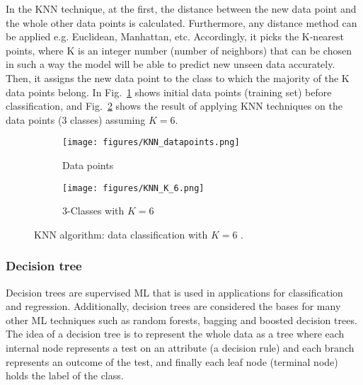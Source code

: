 In the KNN technique, at the first, the distance between the new data point and the whole other data points is calculated.
Furthermore, any distance method can be applied e.g. Euclidean, Manhattan, etc.
Accordingly, it picks the K-nearest points, where K is an integer number (number of neighbors) that can be chosen in such a way the model will be able to predict new unseen data accurately. 
Then, it assigns the new data point to the class to which the majority of the K data points belong.
In Fig.~\ref{fig:datapoints} shows initial data points (training set) before classification, and Fig.~\ref{fig:KNN_K_5} shows the result of applying KNN techniques on the data points (3 classes) assuming \(K=6\).
\begin{figure}[!h]
	\begin{subfigure}[b]{0.49\textwidth}		
		\centering
		\texttt{[image: figures/KNN\_datapoints.png]}
		\caption{Data points } 
		\label{fig:datapoints}
	\end{subfigure}
	\hfill
	\begin{subfigure}[b]{0.49\textwidth}
		\centering
		\texttt{[image: figures/KNN\_K\_6.png]}
		\caption{3-Classes with \(K=6\)} 
		\label{fig:KNN_K_5}
	\end{subfigure}	
	\caption{KNN algorithm: data classification with \(K=6\) .}
	\label{fig:KNN}
\end{figure}

\subsubsection{Decision tree}
Decision trees are supervised ML that is used in applications for classification and regression. 
Additionally, decision trees are considered the bases for many other ML techniques such as random forests, bagging and boosted decision trees.
The idea of a decision tree is to represent the whole data as a tree where each internal node represents a test on an attribute (a decision rule) and each branch represents an outcome of the test, and finally each leaf node (terminal node) holds the label of the class.

